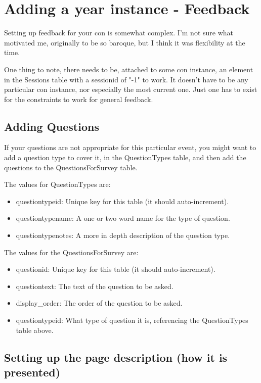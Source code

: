 \documentclass[captions=tablesignature]{scrartcl}
\begin{document}
\section{Adding a year instance - Feedback}
\label{sec-15}

Setting up feedback for your con is somewhat complex.  I'm not sure
what motivated me, originally to be so baroque, but I think it was
flexibility at the time.

One thing to note, there needs to be, attached to some con instance,
an element in the Sessions table with a sessionid of "-1" to work.
It doesn't have to be any particular con instance, nor especially
the most current one.  Just one has to exist for the constraints to
work for general feedback.
\subsection{Adding Questions}
\label{sec-15-1}

If your questions are not appropriate for this particular event,
you might want to add a question type to cover it, in the
QuestionTypes table, and then add the questions to the
QuestionsForSurvey table.

The values for QuestionTypes are:
\begin{itemize}
\item questiontypeid: Unique key for this table (it should auto-increment).
\item questiontypename: A one or two word name for the type of question.
\item questiontypenotes: A more in depth description of the question type.
\end{itemize}

The values for the QuestionsForSurvey are:
\begin{itemize}
\item questionid: Unique key for this table (it should auto-increment).
\item questiontext: The text of the question to be asked.
\item display\_order: The order of the question to be asked.
\item questiontypeid: What type of question it is, referencing the
QuestionTypes table above.
\end{itemize}

\subsection{Setting up the page description (how it is presented)}
\label{sec-15-2}
\end{document}
